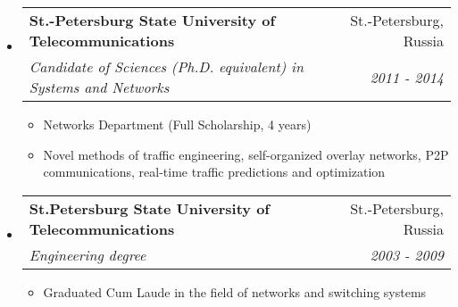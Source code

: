 \documentclass[letterpaper,11pt]{article}
\makeatletter
\newcommand{\resitem}[1]{\item #1 \vspace{-2pt}}
\newcommand{\ressubheading}[4]{
\begin{tabular*}{6.5in}{l@{\cftdotfill{\cftsecdotsep}\extracolsep{\fill}}r}
		\textbf{#1} & #2 \\
		\textit{#3} & \textit{#4} \\
\end{tabular*}\vspace{-6pt}}
\makeatother
\begin{document}
\begin{itemize}

	\item
	\ressubheading{St.-Petersburg State University of Telecommunications}{St.-Petersburg, Russia}{Candidate of Sciences (Ph.D. equivalent) in Systems and Networks}{2011 - 2014}
	\begin{itemize}
		\resitem{Networks Department (Full Scholarship, 4 years)}
		\resitem{Novel methods of traffic engineering, self-organized overlay networks, P2P communications, real-time traffic predictions and optimization}
	\end{itemize}

	\item
	\ressubheading{St.Petersburg State University of Telecommunications}{St.-Petersburg, Russia}{Engineering degree}{2003 - 2009}
	\begin{itemize}
		\resitem{Graduated Cum Laude in the field of networks and switching systems}
	\end{itemize}

\end{itemize}
\end{document}
